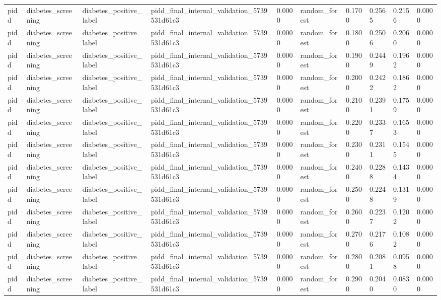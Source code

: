 \begin{tabular}{llllllllll}
pidd & diabetes\_screening & diabetes\_positive\_label & pidd\_final\_internal\_validation\_5739531d61c3 & 0.0000 & random\_forest & 0.1700 & 0.2565 & 0.2156 & 0.0000 \\
pidd & diabetes\_screening & diabetes\_positive\_label & pidd\_final\_internal\_validation\_5739531d61c3 & 0.0000 & random\_forest & 0.1800 & 0.2506 & 0.2060 & 0.0000 \\
pidd & diabetes\_screening & diabetes\_positive\_label & pidd\_final\_internal\_validation\_5739531d61c3 & 0.0000 & random\_forest & 0.1900 & 0.2449 & 0.1962 & 0.0000 \\
pidd & diabetes\_screening & diabetes\_positive\_label & pidd\_final\_internal\_validation\_5739531d61c3 & 0.0000 & random\_forest & 0.2000 & 0.2422 & 0.1862 & 0.0000 \\
pidd & diabetes\_screening & diabetes\_positive\_label & pidd\_final\_internal\_validation\_5739531d61c3 & 0.0000 & random\_forest & 0.2100 & 0.2391 & 0.1759 & 0.0000 \\
pidd & diabetes\_screening & diabetes\_positive\_label & pidd\_final\_internal\_validation\_5739531d61c3 & 0.0000 & random\_forest & 0.2200 & 0.2337 & 0.1653 & 0.0000 \\
pidd & diabetes\_screening & diabetes\_positive\_label & pidd\_final\_internal\_validation\_5739531d61c3 & 0.0000 & random\_forest & 0.2300 & 0.2311 & 0.1545 & 0.0000 \\
pidd & diabetes\_screening & diabetes\_positive\_label & pidd\_final\_internal\_validation\_5739531d61c3 & 0.0000 & random\_forest & 0.2400 & 0.2288 & 0.1434 & 0.0000 \\
pidd & diabetes\_screening & diabetes\_positive\_label & pidd\_final\_internal\_validation\_5739531d61c3 & 0.0000 & random\_forest & 0.2500 & 0.2248 & 0.1319 & 0.0000 \\
pidd & diabetes\_screening & diabetes\_positive\_label & pidd\_final\_internal\_validation\_5739531d61c3 & 0.0000 & random\_forest & 0.2600 & 0.2237 & 0.1202 & 0.0000 \\
pidd & diabetes\_screening & diabetes\_positive\_label & pidd\_final\_internal\_validation\_5739531d61c3 & 0.0000 & random\_forest & 0.2700 & 0.2176 & 0.1082 & 0.0000 \\
pidd & diabetes\_screening & diabetes\_positive\_label & pidd\_final\_internal\_validation\_5739531d61c3 & 0.0000 & random\_forest & 0.2800 & 0.2081 & 0.0958 & 0.0000 \\
pidd & diabetes\_screening & diabetes\_positive\_label & pidd\_final\_internal\_validation\_5739531d61c3 & 0.0000 & random\_forest & 0.2900 & 0.2040 & 0.0830 & 0.0000 \\

\end{tabular}
